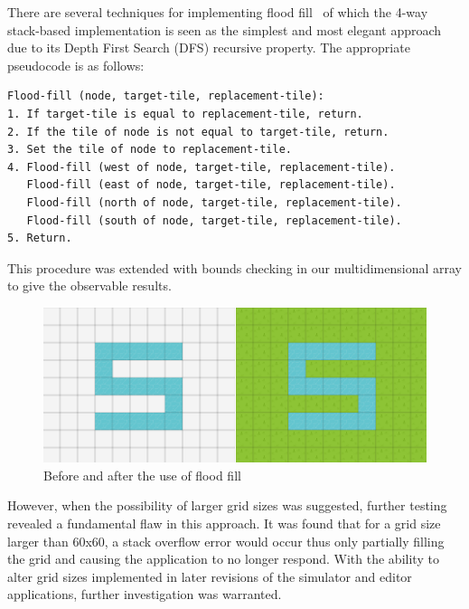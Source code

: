 There are several techniques for implementing flood fill~\cite{lodev2015} of which the 4-way stack-based implementation is seen as the simplest and most elegant approach due to its Depth First Search (DFS) recursive property. The appropriate pseudocode is as follows:

\begin{minipage}{0.9\textwidth}
	\begin{lstlisting}[caption={4-way stack-based recursive flood fill~\cite{codecodex2015}}, label={lst:stackFloodFill}]
Flood-fill (node, target-tile, replacement-tile):
1. If target-tile is equal to replacement-tile, return.
2. If the tile of node is not equal to target-tile, return.
3. Set the tile of node to replacement-tile.
4. Flood-fill (west of node, target-tile, replacement-tile).
   Flood-fill (east of node, target-tile, replacement-tile).
   Flood-fill (north of node, target-tile, replacement-tile).
   Flood-fill (south of node, target-tile, replacement-tile).
5. Return.
	\end{lstlisting}
\end{minipage}

This procedure was extended with bounds checking in our multidimensional array to give the observable results.

\begin{figure}[h]
	\begin{center}
		\includegraphics[scale=0.8]{img/floodFill.png}
		\caption[Flood Fill]{Before and after the use of flood fill}
	\label{fig:floodfill}
	\end{center}
\end{figure}

However, when the possibility of larger grid sizes was suggested, further testing revealed a fundamental flaw in this approach.  It was found that for a grid size larger than 60x60, a stack overflow error would occur thus only partially filling the grid and causing the application to no longer respond.  With the ability to alter grid sizes implemented in later revisions of the simulator and editor applications, further investigation was warranted.

